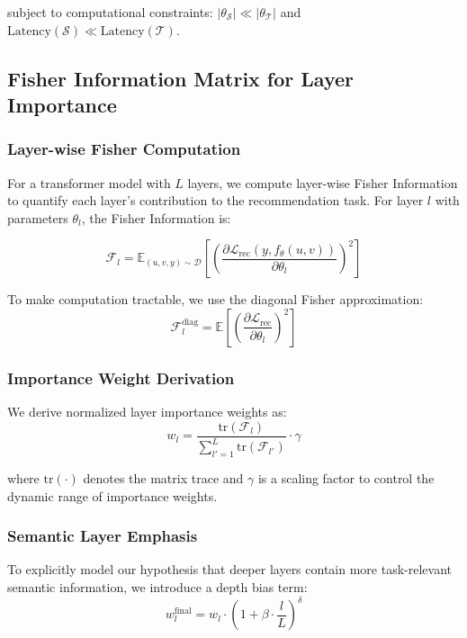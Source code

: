 \documentclass[10pt,conference]{IEEEtran}
\newcommand{\fisher}{\mathcal{F}}
\newcommand{\loss}{\mathcal{L}}
\newcommand{\student}{\mathcal{S}}
\newcommand{\teacher}{\mathcal{T}}
\begin{document}
subject to computational constraints: $|\theta_{\student}| \ll |\theta_{\teacher}|$ and $\text{Latency}(\student) \ll \text{Latency}(\teacher)$.

\subsection{Fisher Information Matrix for Layer Importance}

\subsubsection{Layer-wise Fisher Computation}

For a transformer model with $L$ layers, we compute layer-wise Fisher Information to quantify each layer's contribution to the recommendation task. For layer $l$ with parameters $\theta_l$, the Fisher Information is:

\begin{equation}
\fisher_l = \mathbb{E}_{(u,v,y) \sim \mathcal{D}}\left[\left(\frac{\partial \loss_{\text{rec}}(y, f_{\theta}(u,v))}{\partial \theta_l}\right)^2\right]
\end{equation}

To make computation tractable, we use the diagonal Fisher approximation:
\begin{equation}
\fisher_l^{\text{diag}} = \mathbb{E}\left[\left(\frac{\partial \loss_{\text{rec}}}{\partial \theta_l}\right)^2\right]
\end{equation}

\subsubsection{Importance Weight Derivation}

We derive normalized layer importance weights as:
\begin{equation}
w_l = \frac{\text{tr}(\fisher_l)}{\sum_{l'=1}^L \text{tr}(\fisher_{l'})} \cdot \gamma
\end{equation}

where $\text{tr}(\cdot)$ denotes the matrix trace and $\gamma$ is a scaling factor to control the dynamic range of importance weights.

\subsubsection{Semantic Layer Emphasis}

To explicitly model our hypothesis that deeper layers contain more task-relevant semantic information, we introduce a depth bias term:
\begin{equation}
w_l^{\text{final}} = w_l \cdot \left(1 + \beta \cdot \frac{l}{L}\right)^{\delta}
\end{equation}
\end{document}
